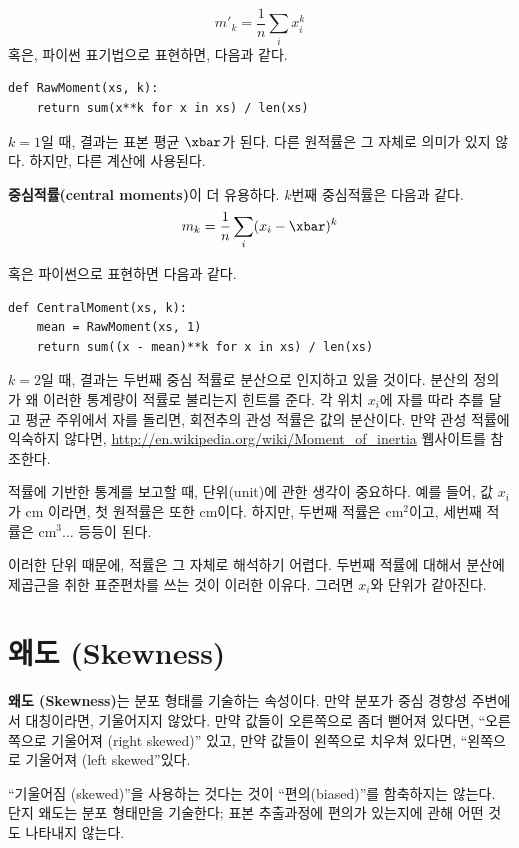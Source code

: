 %
\[ m'_k = \frac{1}{n} \sum_i x_i^k \]
%
혹은, 파이썬 표기법으로 표현하면, 다음과 같다.

\begin{verbatim}
def RawMoment(xs, k):
    return sum(x**k for x in xs) / len(xs)
\end{verbatim}

$k=1$일 때, 결과는 표본 평균 $\xbar$가 된다.
다른 원적률은 그 자체로 의미가 있지 않다. 하지만, 다른 계산에 사용된다.

{\bf 중심적률(central moments)}이 더 유용하다. 
$k$번째 중심적률은 다음과 같다.
%
\[ m_k = \frac{1}{n} \sum_i (x_i - \xbar)^k \]
%

혹은 파이썬으로 표현하면 다음과 같다.

\begin{verbatim}
def CentralMoment(xs, k):
    mean = RawMoment(xs, 1)
    return sum((x - mean)**k for x in xs) / len(xs)
\end{verbatim}

$k=2$일 때, 결과는 두번째 중심 적률로 분산으로 인지하고 있을 것이다.
분산의 정의가 왜 이러한 통계량이 적률로 불리는지 힌트를 준다.
각 위치 $x_i$에 자를 따라 추를 달고 평균 주위에서 자를 돌리면, 
회전추의 관성 적률은 값의 분산이다. 만약 관성 적률에 익숙하지 않다면,
\url{http://en.wikipedia.org/wiki/Moment_of_inertia} 웹사이트를 참조한다.  

적률에 기반한 통계를 보고할 때, 단위(unit)에 관한 생각이 중요하다.
예를 들어, 값 $x_i$가 cm 이라면, 첫 원적률은 또한 cm이다.
하지만, 두번째 적률은 cm$^2$이고, 세번째 적률은 cm$^3$... 등등이 된다.

이러한 단위 때문에, 적률은 그 자체로 해석하기 어렵다.
두번째 적률에 대해서 분산에 제곱근을 취한 표준편차를 쓰는 것이 이러한 이유다. 
그러면 $x_i$와 단위가 같아진다.


\section{왜도 (Skewness)}

{\bf 왜도 (Skewness)}는 분포 형태를 기술하는 속성이다. 
만약 분포가 중심 경향성 주변에서 대칭이라면, 기울어지지 않았다.
만약 값들이 오른쪽으로 좀더 뻗어져 있다면, ``오른쪽으로 기울어져 (right
skewed)'' 있고, 만약 값들이 왼쪽으로 치우쳐 있다면, ``왼쪽으로 기울어져 (left
skewed''있다.


``기울어짐 (skewed)''을 사용하는 것다는 것이 ``편의(biased)''를 함축하지는 않는다.
단지 왜도는 분포 형태만을 기술한다; 표본 추출과정에 편의가 있는지에 관해 
어떤 것도 나타내지 않는다.

